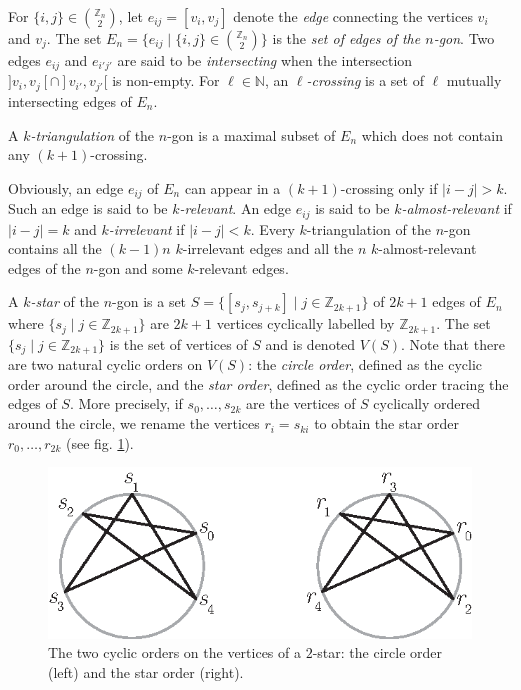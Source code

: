 \documentclass[12pt]{amsart}
\begin{document}
For $\{i,j\}\in{\mathbb{Z}_n \choose 2}$, let $e_{ij}=[v_i,v_j]$ denote the \emph{edge} connecting the vertices $v_i$ and $v_j$. The set $E_n=\{e_{ij}\;|\; \{i,j\}\in{\mathbb{Z}_n \choose 2}\}$ is the \emph{set of edges of the $n$-gon}.
Two edges $e_{ij}$ and $e_{i'j'}$ are said to be \emph{intersecting} when the intersection $]v_i,v_j[\cap]v_{i'},v_{j'}[$ is non-empty.
For $\ell\in\mathbb{N}$, an \emph{$\ell$-crossing} is a set of $\ell$ mutually intersecting edges of $E_n$.

A \emph{$k$-triangulation} of the $n$-gon is a maximal subset of $E_n$ which does not contain any $(k+1)$-crossing.

Obviously, an edge $e_{ij}$ of $E_n$ can appear in a $(k+1)$-crossing only if $|i-j|>k$. Such an edge is said to be \emph{$k$-relevant}. An edge $e_{ij}$ is said to be \emph{$k$-almost-relevant} if $|i-j|=k$ and \emph{$k$-irrelevant} if $|i-j|<k$.
Every $k$-triangulation of the $n$-gon contains all the $(k-1)n$ $k$-irrelevant edges and all the $n$ $k$-almost-relevant edges of the $n$-gon and some $k$-relevant edges.

A \emph{$k$-star} of the $n$-gon is a set $S=\{[s_j,s_{j+k}]\;|\; j\in\mathbb{Z}_{2k+1}\}$ of $2k+1$ edges of $E_n$ where $\{s_j\;|\; j\in\mathbb{Z}_{2k+1}\}$ are $2k+1$ vertices cyclically labelled by $\mathbb{Z}_{2k+1}$. The set $\{s_j\;|\; j\in\mathbb{Z}_{2k+1}\}$ is the set of vertices of $S$ and is denoted $V(S)$. Note that there are two natural cyclic orders on $V(S)$: the \emph{circle order}, defined as the cyclic order around the circle, and the \emph{star order}, defined as the cyclic order tracing the edges of $S$. More precisely, if $s_0,\ldots,s_{2k}$ are the vertices of $S$ cyclically ordered around the circle, we rename the vertices $r_i=s_{ki}$ to obtain the star order $r_0,\ldots,r_{2k}$ (see fig. \ref{star}).

\begin{figure}
\centerline{\includegraphics[scale=1]{star.eps}}
\caption{\small{The two cyclic orders on the vertices of a $2$-star: the circle order (left) and the star order (right).}}\label{star}
\end{figure}
\end{document}
